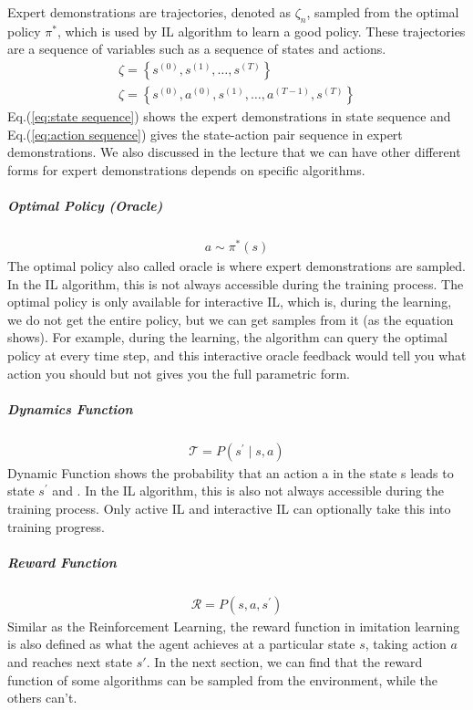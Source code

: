 \documentclass[11pt]{article}
\begin{document}
Expert demonstrations are trajectories, denoted as $\zeta_{n}$, sampled from the optimal policy $\pi^{*}$, which is used by IL algorithm to learn a good policy. These trajectories are a sequence of variables such as a sequence of states and actions. 
\begin{align}
    \zeta=\left\{s^{(0)}, s^{(1)}, \ldots, s^{(T)}\right\}\label{eq:state sequence} \\
 \zeta=\left\{s^{(0)}, a^{(0)}, s^{(1)}, \ldots, a^{(T-1)}, s^{(T)}\right\}\label{eq:action sequence}
\end{align}
Eq.(\ref{eq:state sequence}) shows the expert demonstrations in state sequence and Eq.(\ref{eq:action sequence}) gives the state-action pair sequence in expert demonstrations. We also discussed in the lecture that we can have other different forms for expert demonstrations depends on specific algorithms.
\subparagraph{Optimal Policy (Oracle)}
\begin{align}
    a \sim \pi^{*}(s)
\end{align}
The optimal policy also called oracle is where expert demonstrations are sampled. In the IL algorithm, this is not always accessible during the training process. The optimal policy is only available for interactive IL, which is,  during the learning, we do not get the entire policy, but we can get samples from it (as the equation shows). For example, during the learning, the algorithm can query the optimal policy at every time step, and this interactive oracle feedback would tell you what action you should but not gives you the full parametric form. 
\subparagraph{Dynamics Function}
\begin{align}
    \mathcal{T} = P\left(s^{\prime} \mid s, a\right)
\end{align}
Dynamic Function shows the probability that an action a in the state s leads to state $s^{\prime}$ and . In the IL algorithm, this is also not always accessible during the training process. Only active IL and interactive IL can optionally take this into training progress. 
\subparagraph{Reward Function}
\begin{align}
    \mathcal{R} = P\left(s, a, s^{\prime}\right)
\end{align}
Similar as the Reinforcement Learning, the reward function in imitation learning is also defined as what the agent achieves at a particular state $s$, taking action $a$ and reaches next state $s'$. In the next section, we can find that the reward function of some algorithms can be sampled from the environment, while the others can't.
\end{document}
